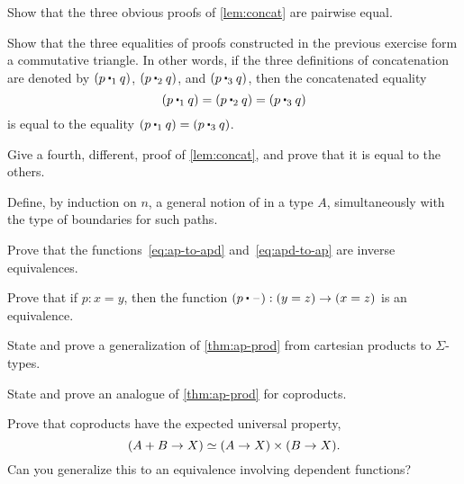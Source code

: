 \sectionExercises

\begin{ex}\label{ex:basics:concat}
  Show that the three obvious proofs of \autoref{lem:concat} are pairwise equal.
\end{ex}

\begin{ex}
  Show that the three equalities of proofs constructed in the previous exercise form a commutative triangle.
  In other words, if the three definitions of concatenation are denoted by $(p \mathbin{\ct_1} q)$, $(p\mathbin{\ct_2} q)$, and $(p\mathbin{\ct_3} q)$, then the concatenated equality
  \[(p\mathbin{\ct_1} q) = (p\mathbin{\ct_2} q) = (p\mathbin{\ct_3} q)\]
  is equal to the equality $(p\mathbin{\ct_1} q) = (p\mathbin{\ct_3} q)$.
\end{ex}

\begin{ex}
  Give a fourth, different, proof of \autoref{lem:concat}, and prove that it is equal to the others.
\end{ex}

\begin{ex}\label{ex:npaths}
  Define, by induction on $n$, a general notion of  in a type $A$, simultaneously with the type of boundaries for such paths.
\end{ex}

\begin{ex}
  Prove that the functions~\eqref{eq:ap-to-apd} and~\eqref{eq:apd-to-ap} are inverse equivalences.
\end{ex}

\begin{ex}\label{ex:equiv-concat}
  Prove that if $p:x=y$, then the function $(p\ct \blank):(y=z) \to (x=z)$ is an equivalence.
\end{ex}

\begin{ex}\label{ex:ap-sigma}
  State and prove a generalization of \autoref{thm:ap-prod} from cartesian products to $\Sigma$-types.
\end{ex}

\begin{ex}
  State and prove an analogue of \autoref{thm:ap-prod} for coproducts.
\end{ex}

\begin{ex}\label{ex:coprod-ump}
  Prove that coproducts have the expected universal property,
  \[ (A+B \to X) \simeq (A\to X)\times (B\to X). \]
  Can you generalize this to an equivalence involving dependent functions?
\end{ex}

